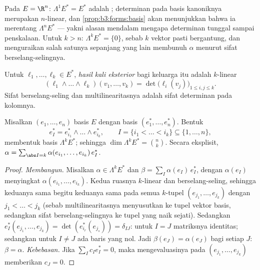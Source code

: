 \begin{example}
Pada $E = \R^n$: $\Lambda^1E^* = E^*$ adalah ;
determinan pada basis kanoniknya merupakan 
$n$-linear, dan \cref{prop:b3:forms:basis} akan menunjukkan bahwa ia
merentang $\Lambda^nE^*$ --- yakni alasan mendalam mengapa determinan
tunggal sampai penskalaan. Untuk $k > n$: $\Lambda^kE^* = \{0\}$, sebab
$k$ vektor pasti bergantung, dan menguraikan salah satunya sepanjang yang lain
membunuh $\alpha$ menurut sifat berselang-selingnya.
\end{example}

\begin{definition}\label{def:b3:forms:wedge}
Untuk $\ell_1, \dots, \ell_k \in E^*$, \emph{hasil kali
eksterior} bagi keluarga itu adalah  $k$-linear
\[
(\ell_1 \wedge \dots \wedge \ell_k)(v_1, \dots, v_k)
= \det\bigl(\ell_i(v_j)\bigr)_{1 \leq i, j \leq k} .
\]
Sifat berselang-seling dan multilinearitasnya adalah sifat determinan pada
kolomnya.
\end{definition}

\begin{proposition}\label{prop:b3:forms:basis}
Misalkan $(e_1, \dots, e_n)$ basis $E$ dengan basis 
$(e_1^*, \dots, e_n^*)$. Bentuk
\[
e_I^* = e_{i_1}^* \wedge \dots \wedge e_{i_k}^*,
\qquad I = \{i_1 < \dots < i_k\} \subseteq \{1, \dots, n\},
\]
membentuk basis $\Lambda^kE^*$; sehingga $\dim\Lambda^kE^* =
\binom nk$. Secara eksplisit, $\alpha =
\sum_{\abs I = k}\alpha(e_{i_1}, \dots, e_{i_k})\,e_I^*$.
\end{proposition}

\begin{proof}
\emph{Membangun.} Misalkan $\alpha \in \Lambda^kE^*$ dan $\beta =
\sum_I\alpha(e_I)\,e_I^*$, dengan $\alpha(e_I)$ menyingkat
$\alpha(e_{i_1}, \dots, e_{i_k})$. Kedua ruasnya $k$-linear
dan berselang-seling, sehingga keduanya sama begitu keduanya sama pada semua
$k$-tupel $(e_{j_1}, \dots, e_{j_k})$ dengan $j_1 < \dots <
j_k$ (sebab multilinearitasnya menyusutkan ke tupel vektor basis,
sedangkan sifat berselang-selingnya ke tupel yang naik sejati). Sedangkan $e_I^*(e_{j_1},
\dots, e_{j_k}) = \det(e_{i_r}^*(e_{j_s})) = \delta_{IJ}$:
untuk $I = J$ matriksnya identitas; sedangkan untuk $I \neq J$ ada
baris yang nol. Jadi $\beta(e_J) = \alpha(e_J)$ bagi setiap $J$:
$\beta = \alpha$. \emph{Kebebasan.} Jika $\sum_I c_Ie_I^* = 0$,
maka mengevaluasinya pada $(e_{j_1}, \dots, e_{j_k})$ memberikan $c_J = 0$.
\end{proof}

